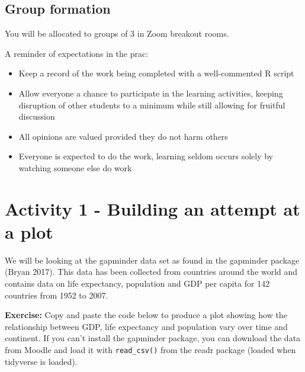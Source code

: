 \documentclass[
]{article}
\providecommand{\tightlist}{%
  \setlength{\itemsep}{0pt}\setlength{\parskip}{0pt}}
\begin{document}
\hypertarget{group-formation}{%
\subsection{Group formation}\label{group-formation}}

You will be allocated to groups of 3 in Zoom breakout rooms.

A reminder of expectations in the prac:

\begin{itemize}
\tightlist
\item
  Keep a record of the work being completed with a well-commented R
  script
\item
  Allow everyone a chance to participate in the learning activities,
  keeping disruption of other students to a minimum while still allowing
  for fruitful discussion
\item
  All opinions are valued provided they do not harm others
\item
  Everyone is expected to do the work, learning seldom occurs solely by
  watching someone else do work
\end{itemize}

\hypertarget{activity-1---building-an-attempt-at-a-plot}{%
\section{Activity 1 - Building an attempt at a
plot}\label{activity-1---building-an-attempt-at-a-plot}}

We will be looking at the gapminder data set as found in the gapminder
package (Bryan 2017). This data has been collected from countries around
the world and contains data on life expectancy, population and GDP per
capita for 142 countries from 1952 to 2007.

\textbf{Exercise:} Copy and paste the code below to produce a plot
showing how the relationship between GDP, life expectancy and population
vary over time and continent. If you can't install the gapminder
package, you can download the data from Moodle and load it with
\texttt{read\_csv()} from the readr package (loaded when tidyverse is
loaded).

\small
\end{document}
